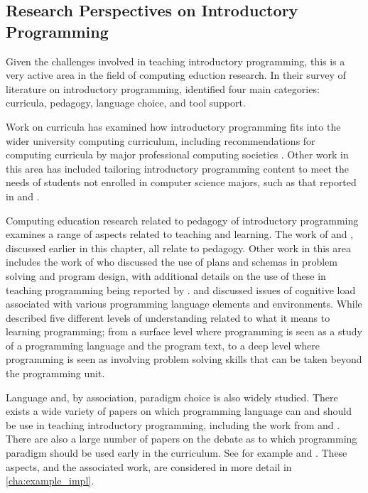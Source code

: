 \clearpage
\subsection{Research Perspectives on Introductory Programming} %
\label{sub:research_perspectives_on_introductory_programming}

Given the challenges involved in teaching introductory programming, this is a very active area in the field of computing eduction research. In their survey of literature on introductory programming, \citet{Pears:2007} identified four main categories: curricula, pedagogy, language choice, and tool support. 

Work on curricula has examined how introductory programming fits into the wider university computing curriculum, including recommendations for computing curricula by major professional computing societies \cite{CC2001,CC2008,CSC2013}. Other work in this area has included tailoring introductory programming content to meet the needs of students not enrolled in computer science majors, such as that reported in \citet{Guzdial:2005} and \citet{Forte:2005}.

Computing education research related to pedagogy of introductory programming examines a range of aspects related to teaching and learning. The work of \citet{BenAri:2001,Denning:1989,Dijkstra:1989,Hoare:1969,Palumbo:1990} and \citet{Robins:2003}, discussed earlier in this chapter, all relate to pedagogy. Other work in this area includes the work of \citet{Soloway:1986} who discussed the use of plans and schemas in problem solving and program design, with additional details on the use of these in teaching programming being reported by \citet{Rist:2004}. \citet{Green:1996} and \citet{Green:2000} discussed issues of cognitive load associated with various programming language elements and environments. While \citet{Eckerdal:2005} described five different levels of understanding related to what it means to learning programming; from a surface level where programming is seen as a study of a programming language and the program text, to a deep level where programming is seen as involving problem solving skills that can be taken beyond the programming unit. 

Language and, by association, paradigm choice is also widely studied. There exists a wide variety of papers on which programming language can and should be use in teaching introductory programming, including the work from \citet{Koffman:1988,Mody:1991,Roberts:1993,Brilliant:1996,Boszormenyi:1998,Howell:2003,Kelleher:2005,Bishop:2006,Mannila:2006,Mannila:2006a,Pendergast:2006,Maloney:2010} and \citet{Anik:2011}. There are also a large number of papers on the debate as to which programming paradigm should be used early in the curriculum. See for example \citet{Pattis:1993,Cooper:2003,Bennedsen:2004,Howe:2004,Astrachan:2005,Lister:2006a,Reges:2006} and \citet{Ehlert:2009}. These aspects, and the associated work, are considered in more detail in \cref{cha:example_impl}.

